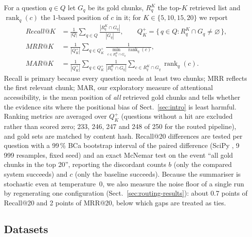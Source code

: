 \documentclass[pdflatex,sn-mathphys-num]{sn-jnl}
\makeatletter
\newif\ifprovenance
\newcommand{\verify}[1]{\ifprovenance\textcolor{red}{{\footnotesize [VERIFY: #1]}}\fi}
\newcommand{\Rec}[1]{Recall@#1}
\newcommand{\MRR}[1]{MRR@#1}
\newcommand{\MAR}[1]{MAR@#1}
\newcommand{\rnk}{\operatorname{rank}}
\theoremstyle{thmstyleone}%
\theoremstyle{thmstylethree}%
\makeatother
\begin{document}
For a question $q\in Q$ let $G_q$ be its gold chunks, $R_q^K$ the top-$K$ retrieved list and $\rnk_q(c)$ the 1-based position of $c$ in it; for $K\in\{5,10,15,20\}$ we report
\begin{align}
\Rec{K}&=\frac{1}{|Q|}\sum_{q\in Q}\frac{|R_q^K\cap G_q|}{|G_q|},\qquad
Q_K^{+}=\{\,q\in Q : R_q^K\cap G_q\neq\varnothing\,\},\label{eq:recall}\\
\MRR{K}&=\frac{1}{|Q_K^{+}|}\sum_{q\in Q_K^{+}}\frac{1}{\min_{c\in R_q^K\cap G_q}\rnk_q(c)},\label{eq:mrr}\\
\MAR{K}&=\frac{1}{|Q_K^{+}|}\sum_{q\in Q_K^{+}}\frac{1}{|R_q^K\cap G_q|}\sum_{c\in R_q^K\cap G_q}\rnk_q(c).\label{eq:mar}
\end{align}
Recall is primary because every question needs at least two chunks; MRR \cite{voorhees1999trec8} reflects the first relevant chunk; MAR, our exploratory measure of attentional accessibility, is the mean position of \emph{all} retrieved gold chunks and tells whether the evidence sits where the positional bias of Sect.~\ref{sec:intro} is least harmful. Ranking metrics are averaged over $Q_K^{+}$ (questions without a hit are excluded rather than scored zero; 233, 246, 247 and 248 of 250 for the routed pipeline)\verify{``Number of N values with NaN MRR in own metrics: 17/250, 4/250, 3/250, 2/250'' printed by cell~7 of \texttt{RnD/benchmarking\_retrievals.ipynb}; the \texttt{np.nanmean} calls in cell~9 implement the exclusion}, and gold sets are matched by content hash. \Rec{20} differences are tested per question with a 99\,\% BCa bootstrap interval of the paired difference \cite{efron1987better,smucker2007comparison} (SciPy \cite{virtanen2020scipy}, 9\,999 resamples, fixed seed) and an exact McNemar test \cite{McNemar_1947,dietterich1998approximate} on the event ``all gold chunks in the top 20'', reporting the discordant counts $b$ (only the compared system succeeds) and $c$ (only the baseline succeeds). Because the summariser is stochastic even at temperature~0, we also measure the noise floor of a single run by regenerating one configuration (Sect.~\ref{sec:routing-results}): about 0.7 points of \Rec{20} and 2 points of \MRR{20}, below which gaps are treated as ties.

\subsection{Datasets}\label{sec:datasets}
\end{document}
